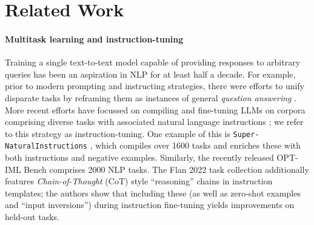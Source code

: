\section{Related Work}
\label{section:related-work}

\paragraph{Multitask learning and instruction-tuning}

Training a single text-to-text model capable of providing responses to arbitrary queries has been an aspiration in NLP for at least half a decade. 
For example, prior to modern prompting and instructing strategies, there were efforts to unify disparate tasks by reframing them as instances of general \emph{question answering} \cite{mccann2018natural, khashabi2020unifiedqa, keskar2019unifying}. 
More recent efforts have focussed on compiling and fine-tuning LLMs on corpora comprising diverse tasks with associated natural language instructions \cite{wei2021finetuned,mishra2021cross,sanh2021multitask}; we refer to this strategy as instruction-tuning. 
One example of this is {\tt Super-NaturalInstructions} \cite{wang2022benchmarking}, which compiles over 1600 tasks and enriches these with both instructions and negative examples. %
Similarly, the recently released OPT-IML Bench \cite{iyer2022opt} comprises 2000 NLP tasks. %
The Flan 2022 task collection \cite{longpre2023flan} additionally features \emph{Chain-of-Thought} (CoT) style ``reasoning'' chains in instruction templates; the authors show that including these (as well as zero-shot examples and ``input inversions'') during instruction fine-tuning yields improvements on held-out tasks. 

